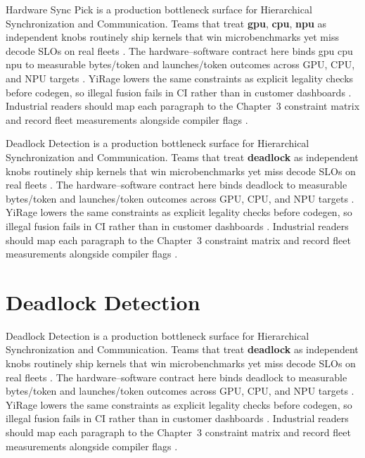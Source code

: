 Hardware Sync Pick is a production bottleneck surface for Hierarchical Synchronization and Communication. Teams that treat \textbf{gpu}, \textbf{cpu}, \textbf{npu} as independent knobs routinely ship kernels that win microbenchmarks yet miss decode SLOs on real fleets \citep{patel2025llminference,nvidia2022hopper}. The hardware--software contract here binds gpu cpu npu to measurable bytes/token and launches/token outcomes across GPU, CPU, and NPU targets \citep{taxbreak2026,semianalysis2024tma}. YiRage lowers the same constraints as explicit legality checks before codegen, so illegal fusion fails in CI rather than in customer dashboards \citep{memoryfloor2026,amd2024xdna}. Industrial readers should map each paragraph to the Chapter~3 constraint matrix and record fleet measurements alongside compiler flags \citep{nvidia2022hopper,amd2024aie}.

Deadlock Detection is a production bottleneck surface for Hierarchical Synchronization and Communication. Teams that treat \textbf{deadlock} as independent knobs routinely ship kernels that win microbenchmarks yet miss decode SLOs on real fleets \citep{taxbreak2026,semianalysis2024tma}. The hardware--software contract here binds deadlock to measurable bytes/token and launches/token outcomes across GPU, CPU, and NPU targets \citep{memoryfloor2026,amd2024xdna}. YiRage lowers the same constraints as explicit legality checks before codegen, so illegal fusion fails in CI rather than in customer dashboards \citep{nvidia2022hopper,amd2024aie}. Industrial readers should map each paragraph to the Chapter~3 constraint matrix and record fleet measurements alongside compiler flags \citep{semianalysis2024tma,dlbook}.

\section{Deadlock Detection}
\label{sec:deadlock_detection}

Deadlock Detection is a production bottleneck surface for Hierarchical Synchronization and Communication. Teams that treat \textbf{deadlock} as independent knobs routinely ship kernels that win microbenchmarks yet miss decode SLOs on real fleets \citep{memoryfloor2026,amd2024xdna}. The hardware--software contract here binds deadlock to measurable bytes/token and launches/token outcomes across GPU, CPU, and NPU targets \citep{nvidia2022hopper,amd2024aie}. YiRage lowers the same constraints as explicit legality checks before codegen, so illegal fusion fails in CI rather than in customer dashboards \citep{semianalysis2024tma,dlbook}. Industrial readers should map each paragraph to the Chapter~3 constraint matrix and record fleet measurements alongside compiler flags \citep{amd2024xdna,dao2022flashattention}.


